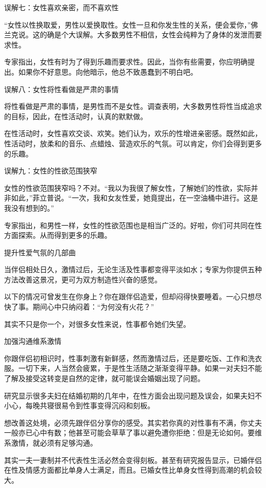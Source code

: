 \documentclass[12pt,UTF8]{ctexbook}
\begin{document}
误解七：女性喜欢亲密，而不喜欢性

“女性以性换取爱，男性以爱换取性。女性一旦和你发生性的关系，便会爱你，”佛兰克说。这的确是个大误解。大多数男性不相信，女性会纯粹为了身体的发泄而要求性。

专家指出，女性有时为了得到乐趣而要求性。因此，当你有些需要，你应明确提出。如果你不好意思。向他暗示，他总不致愚蠢到不明白吧。

误解八：女性将性看做是严肃的事情

将性看做是严肃的事情，是男性而不是女性。调查表明，大多数男性将性当成追求的目标，因此，在性活动时，认真的默默做。

在性活动时，女性喜欢交谈、欢笑。她们认为，欢乐的性增进亲密感。既然如此，性活动时，放柔和的音乐、点蜡烛、营造欢乐的气氛。可以肯定，你们会得到更多的乐趣。

误解九：女性的性欲范围狭窄

女性的性欲范围狭窄吗？不对。“我以为我很了解女性，了解她们的性欲，实际并非如此，”菲立普说。“一次，我和女友性爱，她竟提出，在一空油桶中进行。这是我没有想到的。”

专家指出，和男性一样，女性的性欲范围也是相当广泛的。好啦，你们可共同在性方面探索。从而得到更多的乐趣。





提升性爱气氛的几部曲


当伴侣相处日久，激情过后，无论生活及性事都变得平淡如水；专家为你提供五种方法改善这景况，更可为双方制造性兴奋的感觉。

以下的情况可曾发生在你身上？你在跟伴侣造爱，但却闷得快要睡着。一心只想尽快了事。期间心中只纳闷着：“为何没有火花？”

其实不只是你一个，对很多女性来说，性事都令她们失望。

加强沟通维系激情

你跟伴侣初相识时，性事刺激有新鲜感，然而激情过后，还是要吃饭、工作和洗衣服。一切下来，人当然会疲累，于是性生活随之渐渐变得平静。如果一对夫妇不能了解及接受这转变是自然的定律，就可能误会婚姻出现了问题。

研究显示很多夫妇在结婚初期的几年中，在性方面会出现问题及误会，如果夫妇不小心，每晚共寝很易令到性事变得沉闷和刻板。

想改善这处境，必须先跟伴侣分享你的感受。其实若你真的对性事有不满，你丈夫一般亦已心中有数；他甚至可能会草草了事以避免遭你拒绝：但是无论如何。要维系激情，就必须有足够沟通。

其实一夫一妻制并不代表性生活必然会变得刻板。甚至有研究报告显示，已婚伴侣在性及情感方面都比单身人士满足，而且。已婚女性比单身女性得到高潮的机会较大。
\end{document}
